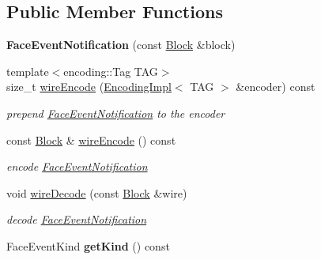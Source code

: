\subsection*{Public Member Functions}
\begin{DoxyCompactItemize}
\item 
{\bfseries Face\+Event\+Notification} (const \hyperlink{classndn_1_1Block}{Block} \&block)\hypertarget{classndn_1_1nfd_1_1FaceEventNotification_ad74c62364a4768c142473d5d1a3ea3df}{}\label{classndn_1_1nfd_1_1FaceEventNotification_ad74c62364a4768c142473d5d1a3ea3df}

\item 
{\footnotesize template$<$encoding\+::\+Tag T\+AG$>$ }\\size\+\_\+t \hyperlink{classndn_1_1nfd_1_1FaceEventNotification_a89c80d5f530c877e858232be81eb67a1}{wire\+Encode} (\hyperlink{classndn_1_1encoding_1_1EncodingImpl}{Encoding\+Impl}$<$ T\+AG $>$ \&encoder) const\hypertarget{classndn_1_1nfd_1_1FaceEventNotification_a89c80d5f530c877e858232be81eb67a1}{}\label{classndn_1_1nfd_1_1FaceEventNotification_a89c80d5f530c877e858232be81eb67a1}

\begin{DoxyCompactList}\small\item\em prepend \hyperlink{classndn_1_1nfd_1_1FaceEventNotification}{Face\+Event\+Notification} to the encoder \end{DoxyCompactList}\item 
const \hyperlink{classndn_1_1Block}{Block} \& \hyperlink{classndn_1_1nfd_1_1FaceEventNotification_a287751dbb7e09ff5b6fa3c5377e3f492}{wire\+Encode} () const\hypertarget{classndn_1_1nfd_1_1FaceEventNotification_a287751dbb7e09ff5b6fa3c5377e3f492}{}\label{classndn_1_1nfd_1_1FaceEventNotification_a287751dbb7e09ff5b6fa3c5377e3f492}

\begin{DoxyCompactList}\small\item\em encode \hyperlink{classndn_1_1nfd_1_1FaceEventNotification}{Face\+Event\+Notification} \end{DoxyCompactList}\item 
void \hyperlink{classndn_1_1nfd_1_1FaceEventNotification_a7ec8d5a55730397fb9a79bf3a44a10d9}{wire\+Decode} (const \hyperlink{classndn_1_1Block}{Block} \&wire)\hypertarget{classndn_1_1nfd_1_1FaceEventNotification_a7ec8d5a55730397fb9a79bf3a44a10d9}{}\label{classndn_1_1nfd_1_1FaceEventNotification_a7ec8d5a55730397fb9a79bf3a44a10d9}

\begin{DoxyCompactList}\small\item\em decode \hyperlink{classndn_1_1nfd_1_1FaceEventNotification}{Face\+Event\+Notification} \end{DoxyCompactList}\item 
Face\+Event\+Kind {\bfseries get\+Kind} () const\hypertarget{classndn_1_1nfd_1_1FaceEventNotification_a7e60e98ffcfe1ce56d7e6679c1ef5ec5}{}\label{classndn_1_1nfd_1_1FaceEventNotification_a7e60e98ffcfe1ce56d7e6679c1ef5ec5}


\end{DoxyCompactItemize}
